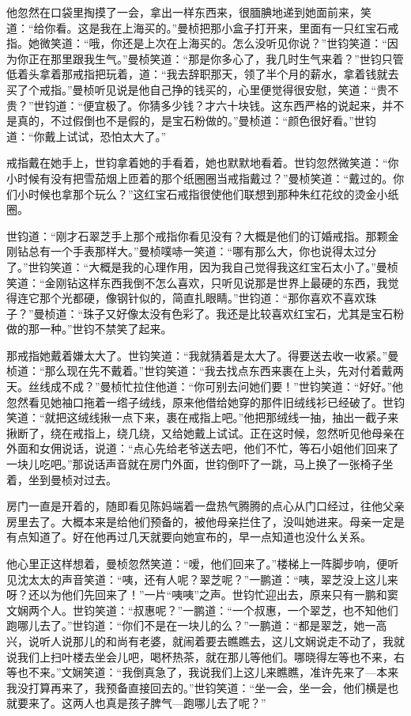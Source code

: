 \par 他忽然在口袋里掏摸了一会，拿出一样东西来，很腼腆地递到她面前来，笑道：“给你看。这是我在上海买的。”曼桢把那小盒子打开来，里面有一只红宝石戒指。她微笑道：“哦，你还是上次在上海买的。怎么没听见你说？”世钧笑道：“因为你正在那里跟我生气。”曼桢笑道：“那是你多心了，我几时生气来着？”世钧只管低着头拿着那戒指把玩着，道：“我去辞职那天，领了半个月的薪水，拿着钱就去买了个戒指。”曼桢听见说是他自己挣的钱买的，心里便觉得很安慰，笑道：“贵不贵？”世钧道：“便宜极了。你猜多少钱？才六十块钱。这东西严格的说起来，并不是真的，不过假倒也不是假的，是宝石粉做的。”曼桢道：“颜色很好看。”世钧道：“你戴上试试，恐怕太大了。”
\par 戒指戴在她手上，世钧拿着她的手看着，她也默默地看着。世钧忽然微笑道：“你小时候有没有把雪茄烟上匝着的那个纸圈圈当戒指戴过？”曼桢笑道：“戴过的。你们小时候也拿那个玩么？”这红宝石戒指很使他们联想到那种朱红花纹的烫金小纸圈。
\par 世钧道：“刚才石翠芝手上那个戒指你看见没有？大概是他们的订婚戒指。那颗金刚钻总有一个手表那样大。”曼桢噗哧一笑道：“哪有那么大，你也说得太过分了。”世钧笑道：“大概是我的心理作用，因为我自己觉得我这红宝石太小了。”曼桢笑道：“金刚钻这样东西我倒不怎么喜欢，只听见说那是世界上最硬的东西，我觉得连它那个光都硬，像钢针似的，简直扎眼睛。”世钧道：“那你喜欢不喜欢珠子？”曼桢道：“珠子又好像太没有色彩了。我还是比较喜欢红宝石，尤其是宝石粉做的那一种。”世钧不禁笑了起来。
\par 那戒指她戴着嫌太大了。世钧笑道：“我就猜着是太大了。得要送去收一收紧。”曼桢道：“那么现在先不戴着。”世钧笑道：“我去找点东西来裹在上头，先对付着戴两天。丝线成不成？”曼桢忙拉住他道：“你可别去问她们要！”世钧笑道：“好好。”他忽然看见她袖口拖着一绺子绒线，原来他借给她穿的那件旧绒线衫已经破了。世钧笑道：“就把这绒线揪一点下来，裹在戒指上吧。”他把那绒线一抽，抽出一截子来揪断了，绕在戒指上，绕几绕，又给她戴上试试。正在这时候，忽然听见他母亲在外面和女佣说话，说道：“点心先给老爷送去吧，他们不忙，等石小姐他们回来了一块儿吃吧。”那说话声音就在房门外面，世钧倒吓了一跳，马上换了一张椅子坐着，坐到曼桢对过去。
\par 房门一直是开着的，随即看见陈妈端着一盘热气腾腾的点心从门口经过，往他父亲房里去了。大概本来是给他们预备的，被他母亲拦住了，没叫她进来。母亲一定是有点知道了。好在他再过几天就要向她宣布的，早一点知道也没什么关系。
\par 他心里正这样想着，曼桢忽然笑道：“嗳，他们回来了。”楼梯上一阵脚步响，便听见沈太太的声音笑道：“咦，还有人呢？翠芝呢？”一鹏道：“咦，翠芝没上这儿来呀？还以为他们先回来了！”一片“咦咦”之声。世钧忙迎出去，原来只有一鹏和窦文娴两个人。世钧笑道：“叔惠呢？”一鹏道：“一个叔惠，一个翠芝，也不知他们跑哪儿去了。”世钧道：“你们不是在一块儿的么？”一鹏道：“都是翠芝，她一高兴，说听人说那儿的和尚有老婆，就闹着要去瞧瞧去，这儿文娴说走不动了，我就说我们上扫叶楼去坐会儿吧，喝杯热茶，就在那儿等他们。哪晓得左等也不来，右等也不来。”文娴笑道：“我倒真急了，我说我们上这儿来瞧瞧，准许先来了—本来我没打算再来了，我预备直接回去的。”世钧笑道：“坐一会，坐一会，他们横是也就要来了。这两人也真是孩子脾气—跑哪儿去了呢？”
